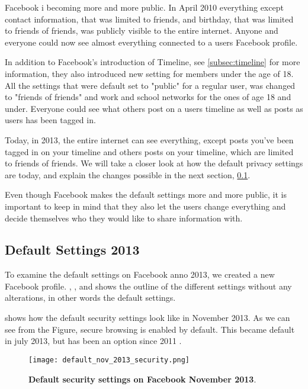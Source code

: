 Facebook i becoming more and more public. In April 2010 everything except contact information, that was limited to friends, and birthday, that was limited to friends of friends, was publicly visible to the entire internet. Anyone and everyone could now see almost everything connected to a users Facebook profile. 

In addition to Facebook's introduction of Timeline, see \ref{subsec:timeline} for more information, they also introduced new setting for members under the age of 18. All the settings that were default set to "public" for a regular user, was changed to "friends of friends" and work and school networks for the ones of age 18 and under. Everyone could see what others post on a users timeline as well as posts as users has been tagged in.

Today, in 2013, the entire internet can see everything,  except posts you've been tagged in on your timeline and others posts on your timeline, which are limited to friends of friends. We will take a closer look at how the default privacy settings are today, and explain the changes possible in the next section, \ref{subsec:default2013}. 

Even though Facebook makes the default settings more and more public, it is important to keep in mind that they also let the users change everything and decide themselves who they would like to share information with.   


\subsection{Default Settings 2013}
\label{subsec:default2013}

To examine the default settings on Facebook anno 2013, we created a new Facebook profile. , ,  and  shows the outline of the different settings without any alterations, in other words the default settings. 

 shows how the default security settings look like in November 2013. As we can see from the Figure, secure browsing is enabled by default. This became default in july 2013, but has been an option since 2011 \cite{secureBrowsing}. 

\begin{figure}[b]
\centering
\texttt{[image: default\_nov\_2013\_security.png]}
\caption[Default security settings on Facebook November 2013]{\textbf{Default security settings on Facebook November 2013}.} 
\label{fig:security2013}
\end{figure}

